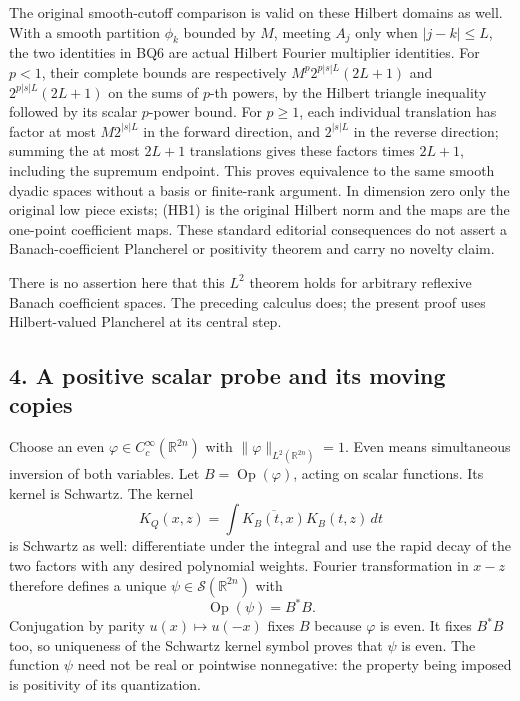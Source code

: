 \documentclass[
  11pt,
]{article}
\begin{document}
The original smooth-cutoff comparison is valid on these Hilbert domains
as well. With a smooth partition \(\phi_k\) bounded by \(M\), meeting
\(A_j\) only when \(|j-k|\le L\), the two identities in BQ6 are actual
Hilbert Fourier multiplier identities. For \(p<1\), their complete
bounds are respectively \(M^p2^{p|s|L}(2L+1)\) and \(2^{p|s|L}(2L+1)\)
on the sums of \(p\)-th powers, by the Hilbert triangle inequality
followed by its scalar \(p\)-power bound. For \(p\ge1\), each individual
translation has factor at most \(M2^{|s|L}\) in the forward direction,
and \(2^{|s|L}\) in the reverse direction; summing the at most \(2L+1\)
translations gives these factors times \(2L+1\), including the supremum
endpoint. This proves equivalence to the same smooth dyadic spaces
without a basis or finite-rank argument. In dimension zero only the
original low piece exists; (HB1) is the original Hilbert norm and the
maps are the one-point coefficient maps. These standard editorial
consequences do not assert a Banach-coefficient Plancherel or positivity
theorem and carry no novelty claim.

There is no assertion here that this \(L^2\) theorem holds for arbitrary
reflexive Banach coefficient spaces. The preceding calculus does; the
present proof uses Hilbert-valued Plancherel at its central step.

\subsection{4. A positive scalar probe and its moving
copies}\label{a-positive-scalar-probe-and-its-moving-copies}

Choose an even \(\varphi\in C_c^\infty(\mathbb R^{2n})\) with
\(\|\varphi\|_{L^2(\mathbb R^{2n})}=1\). Even means simultaneous
inversion of both variables. Let \(B=\operatorname{Op}(\varphi)\),
acting on scalar functions. Its kernel is Schwartz. The kernel \[
 K_Q(x,z)=\int\overline{K_B(t,x)}K_B(t,z)\,dt
\tag{P22}
\] is Schwartz as well: differentiate under the integral and use the
rapid decay of the two factors with any desired polynomial weights.
Fourier transformation in \(x-z\) therefore defines a unique
\(\psi\in\mathcal S(\mathbb R^{2n})\) with \[
 \operatorname{Op}(\psi)=B^*B.
\tag{P23}
\] Conjugation by parity \(u(x)\mapsto u(-x)\) fixes \(B\) because
\(\varphi\) is even. It fixes \(B^*B\) too, so uniqueness of the
Schwartz kernel symbol proves that \(\psi\) is even. The function
\(\psi\) need not be real or pointwise nonnegative: the property being
imposed is positivity of its quantization.
\end{document}
